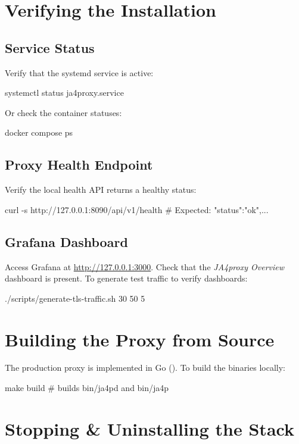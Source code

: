 \section{Verifying the Installation}

\subsection{Service Status}
Verify that the systemd service is active:
\begin{bashcode}
systemctl status ja4proxy.service
\end{bashcode}
Or check the container statuses:
\begin{bashcode}
docker compose ps
\end{bashcode}

\subsection{Proxy Health Endpoint}
Verify the local health API returns a healthy status:
\begin{bashcode}
curl -s http://127.0.0.1:8090/api/v1/health
# Expected: {"status":"ok",...}
\end{bashcode}

\subsection{Grafana Dashboard}
Access Grafana at \url{http://127.0.0.1:3000}. Check that the \emph{JA4proxy Overview} dashboard is present. To generate test traffic to verify dashboards:
\begin{bashcode}
./scripts/generate-tls-traffic.sh 30 50 5
\end{bashcode}

\section{Building the Proxy from Source}

The production proxy is implemented in Go (). To build the binaries locally:
\begin{bashcode}
make build            # builds bin/ja4pd and bin/ja4p
\end{bashcode}

\section{Stopping \& Uninstalling the Stack}

